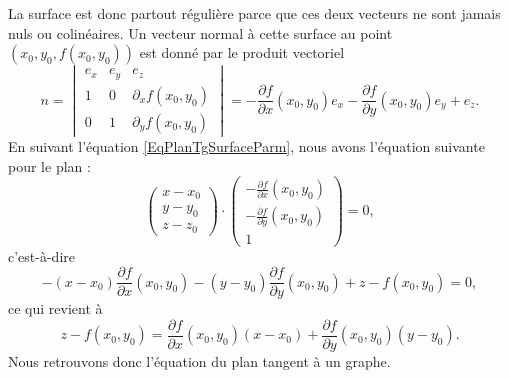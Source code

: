 La surface est donc partout régulière parce que ces deux vecteurs ne sont jamais nuls ou colinéaires. Un vecteur normal à cette surface au point \( (x_0,y_0,f(x_0,y_0))\) est donné par le produit vectoriel
\begin{equation}
	n=\begin{vmatrix}
		e_x & e_y & e_z                  \\
		1   & 0   & \partial_xf(x_0,y_0) \\
		0   & 1   & \partial_yf(x_0,y_0)
	\end{vmatrix}
	=-\frac{ \partial f }{ \partial x }(x_0,y_0)e_x-\frac{ \partial f }{ \partial y }(x_0,y_0)e_y+e_z.
\end{equation}
En suivant l'équation \eqref{EqPlanTgSurfaceParm}, nous avons l'équation suivante pour le plan :
\begin{equation}
	\begin{pmatrix}
		x-x_0 \\
		y-y_0 \\
		z-z_0
	\end{pmatrix}\cdot
	\begin{pmatrix}
		-\frac{ \partial f }{ \partial x }(x_0,y_0) \\
		-\frac{ \partial f }{ \partial y }(x_0,y_0) \\
		1
	\end{pmatrix}=0,
\end{equation}
c'est-à-dire
\begin{equation}
	-(x-x_0)\frac{ \partial f }{ \partial x }(x_0,y_0)-(y-y_0)\frac{ \partial f }{ \partial y }(x_0,y_0)+z-f(x_0,y_0)=0,
\end{equation}
ce qui revient à
\begin{equation}
	z-f(x_0,y_0)=\frac{ \partial f }{ \partial x }(x_0,y_0)(x-x_0)+\frac{ \partial f }{ \partial y }(x_0,y_0)(y-y_0).
\end{equation}
Nous retrouvons donc l'équation du plan tangent à un graphe.

